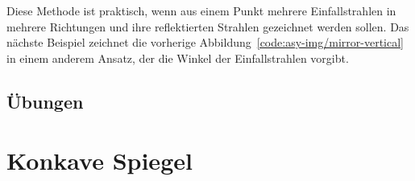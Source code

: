 Diese Methode ist praktisch, wenn aus einem Punkt mehrere Einfallstrahlen in mehrere Richtungen und ihre reflektierten Strahlen gezeichnet werden sollen.
Das nächste Beispiel zeichnet die vorherige Abbildung~\ref{code:asy-img/mirror-vertical} in einem anderem Ansatz, der die Winkel der Einfallstrahlen vorgibt.



\subsection{Übungen}


\section{Konkave Spiegel}




